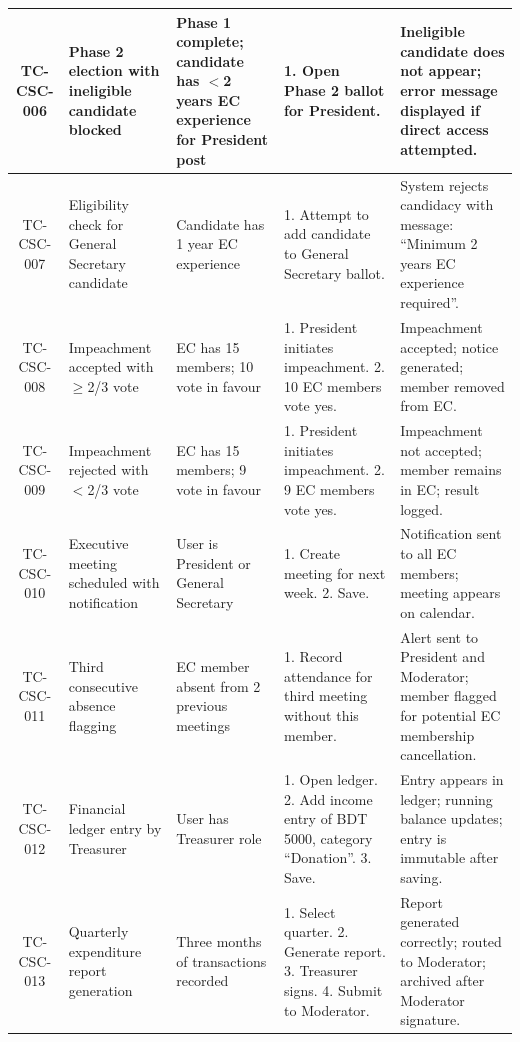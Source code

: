 \documentclass[12pt,a4paper]{article}
\begin{document}
\begin{center}
\begin{longtable}{|c|p{3cm}|p{2.5cm}|p{3.5cm}|p{4cm}|}
\rowcolor{LightBlue}
TC-CSC-006 & Phase 2 election with ineligible candidate blocked & Phase 1 complete; candidate has $<$2 years EC experience for President post & 1. Open Phase 2 ballot for President. & Ineligible candidate does not appear; error message displayed if direct access attempted. \\ \hline

\rowcolor{LightTeal}
TC-CSC-007 & Eligibility check for General Secretary candidate & Candidate has 1 year EC experience & 1. Attempt to add candidate to General Secretary ballot. & System rejects candidacy with message: ``Minimum 2 years EC experience required''. \\ \hline

\rowcolor{LightBlue}
TC-CSC-008 & Impeachment accepted with $\geq$2/3 vote & EC has 15 members; 10 vote in favour & 1. President initiates impeachment. 2. 10 EC members vote yes. & Impeachment accepted; notice generated; member removed from EC. \\ \hline

\rowcolor{LightTeal}
TC-CSC-009 & Impeachment rejected with $<$2/3 vote & EC has 15 members; 9 vote in favour & 1. President initiates impeachment. 2. 9 EC members vote yes. & Impeachment not accepted; member remains in EC; result logged. \\ \hline

\rowcolor{LightBlue}
TC-CSC-010 & Executive meeting scheduled with notification & User is President or General Secretary & 1. Create meeting for next week. 2. Save. & Notification sent to all EC members; meeting appears on calendar. \\ \hline

\rowcolor{LightTeal}
TC-CSC-011 & Third consecutive absence flagging & EC member absent from 2 previous meetings & 1. Record attendance for third meeting without this member. & Alert sent to President and Moderator; member flagged for potential EC membership cancellation. \\ \hline

\rowcolor{LightBlue}
TC-CSC-012 & Financial ledger entry by Treasurer & User has Treasurer role & 1. Open ledger. 2. Add income entry of BDT 5000, category ``Donation''. 3. Save. & Entry appears in ledger; running balance updates; entry is immutable after saving. \\ \hline

\rowcolor{LightTeal}
TC-CSC-013 & Quarterly expenditure report generation & Three months of transactions recorded & 1. Select quarter. 2. Generate report. 3. Treasurer signs. 4. Submit to Moderator. & Report generated correctly; routed to Moderator; archived after Moderator signature. \\ \hline


\end{longtable}
\end{center}
\end{document}
